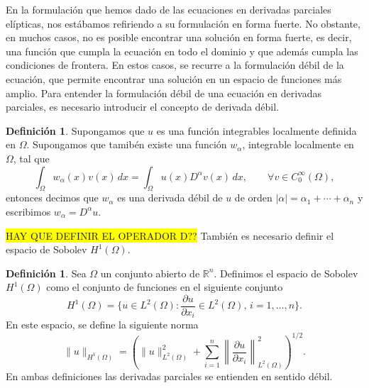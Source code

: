 \documentclass[a4paper,11pt,spanish, twoside, leqno]{tfg-uam}
\theoremstyle{definition}
\newtheorem{defin}[teor]{Definici\'on}
\begin{document}
En la formulación que hemos dado de las ecuaciones en derivadas parciales elípticas, nos estábamos refiriendo a su formulación en forma fuerte. No obstante, en muchos casos, no es posible encontrar una solución en forma fuerte, es decir, una función que cumpla la ecuación en todo el dominio y que además cumpla las condiciones de frontera. En estos casos, se recurre a la  formulación débil de la ecuación, que permite encontrar una solución en un espacio de funciones más amplio. Para entender la formulación débil de una ecuación en derivadas parciales, es necesario introducir el concepto de derivada débil.

\begin{mdframed}
    \begin{defin}
        Supongamos que $u$ es una función integrables localmente definida en $\Omega$. Supongamos que tamibén existe una función $w_\alpha$, integrable localmente en $\Omega$, tal que
        \begin{equation*}
            \int_\Omega w_\alpha(x)v(x) \, dx = \int_\Omega u(x)D^\alpha v(x) \, dx, \qquad \forall v \in C_0^\infty(\Omega),
        \end{equation*}
        entonces decimos que $w_\alpha$ es una derivada débil de $u$ de orden $|\alpha| = \alpha_1 + \cdots + \alpha_n$ y escribimos $w_\alpha = D^\alpha u$.
    \end{defin}
\end{mdframed}
\colorbox{yellow}{HAY QUE DEFINIR EL OPERADOR D??}
También es necesario definir el espacio de Sobolev $H^1(\Omega)$.
\begin{mdframed}
\begin{defin}
    Sea $\Omega$ un conjunto abierto de $\mathbb{R}^n$. Definimos el espacio de Sobolev $H^1(\Omega)$ como el conjunto de funciones en el siguiente conjunto
    \begin{equation}
        H^1(\Omega)=\{u\in L^2(\Omega): \frac{\partial u}{\partial x_i}\in L^2(\Omega), \, i=1,\dots,n\}.
    \end{equation}
    En este espacio, se define la siguiente norma
    \begin{equation}
        \|u\|_{H^1(\Omega)}=\left(\|u\|^2_{L^2(\Omega)} + \sum_{i=1}^{n}\left\|\frac{\partial u}{\partial x_i}\right\|^2_{L^2(\Omega)}\right)^{1/2}.
    \end{equation}
    En ambas definiciones las derivadas parciales se entienden en sentido débil.
\end{defin}
\end{mdframed}
    
\end{document}
